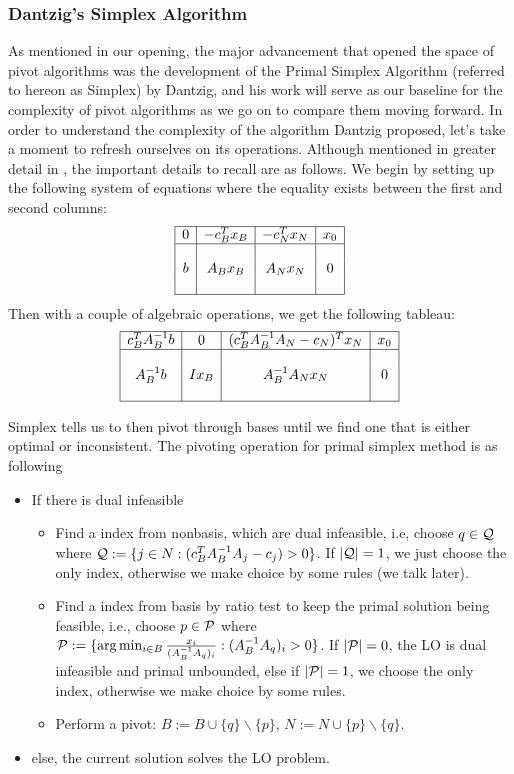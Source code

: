 \documentclass[11pt]{article}
\begin{document}
\subsubsection{Dantzig's Simplex Algorithm}
As mentioned in our opening, the major advancement that opened the space of pivot algorithms was the development of the Primal Simplex Algorithm (referred to hereon as Simplex) by Dantzig, and his work will serve as our baseline for the complexity of pivot algorithms as we go on to compare them moving forward. In order to understand the complexity of the algorithm Dantzig proposed, let's take a moment to refresh ourselves on its operations. Although mentioned in greater detail in \cite{dantzig1951maximization}, the important details to recall are as follows. We begin by setting up the following system of equations where the equality exists between the first and second columns:
\[\begin{array}{|c|c|c|c|}
	\hline
	0 & -c_B^T x_B & -c_N^T x_N & x_0 \\
	\hline
	&&&\\
	b & A_B x_B & A_N x_N & 0 \\
	&&&\\
	\hline
\end{array}\]
Then with a couple of algebraic operations, we get the following tableau:
\[\begin{array}{|c|c|c|c|}
	\hline
	c_B^T A_B^{-1} b & 0 & (c_B^T A_B^{-1} A_N -c_N)^T x_N & x_0 \\
	\hline
	&&&\\
	A_B^{-1}b & Ix_B & A_B^{-1}A_N x_N & 0 \\
	&&&\\
	\hline
\end{array}\]

Simplex tells us to then pivot through bases until we find one that is either optimal or inconsistent. The pivoting operation for primal simplex method is as following
\begin{itemize}
	\item If there is dual infeasible
	\begin{itemize}
		\item Find a index from nonbasis, which are dual infeasible, i.e, choose $q \in {\cal Q}$ where ${\cal Q}
		:= \{j \in N: (c_B^T A_B^{-1} A_j -c_j) > 0\}$. If $|{\cal Q}| = 1$, we just choose the only index, otherwise we make choice by some rules (we talk later). 
		\item Find a index from basis by ratio test to keep the primal solution being feasible, i.e., choose $p \in {\cal P}$ where ${\cal P}:=\{\arg \min_{i \in B} \frac{x_i}{(A_B^{-1}A_q)_{i}}: (A_B^{-1}A_q)_{i} >0 \}$.  If $|{\cal P}| = 0$, the LO is dual infeasible and primal unbounded, else if $|{\cal P}| = 1$, we choose the only index, otherwise we make choice by some rules. 
		\item Perform a pivot: $B:= B \cup \{q\} \backslash \{p\}$, $N:= N \cup \{p\} \backslash \{q\}$.
	\end{itemize}
	\item else, the current solution solves the LO problem.
\end{itemize} 
\end{document}
